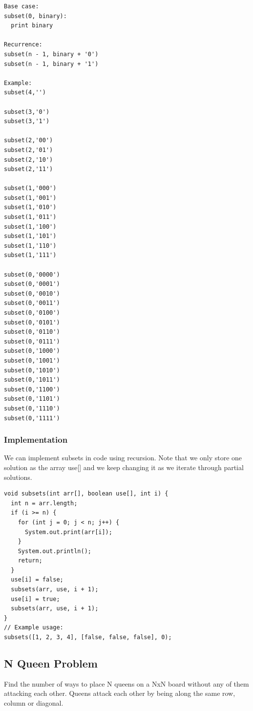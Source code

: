 \documentclass[11pt,oneside]{book}
\begin{document}
\begin{lstlisting}
Base case:
subset(0, binary):
  print binary
 
Recurrence:
subset(n - 1, binary + '0')
subset(n - 1, binary + '1')
 
Example:
subset(4,'')
 
subset(3,'0')
subset(3,'1')
 
subset(2,'00')
subset(2,'01')
subset(2,'10')
subset(2,'11')
 
subset(1,'000')
subset(1,'001')
subset(1,'010')
subset(1,'011')
subset(1,'100')
subset(1,'101')
subset(1,'110')
subset(1,'111')
 
subset(0,'0000')
subset(0,'0001')
subset(0,'0010')
subset(0,'0011')
subset(0,'0100')
subset(0,'0101')
subset(0,'0110')
subset(0,'0111')
subset(0,'1000')
subset(0,'1001')
subset(0,'1010')
subset(0,'1011')
subset(0,'1100')
subset(0,'1101')
subset(0,'1110')
subset(0,'1111')
\end{lstlisting}

\subsubsection{Implementation}

We can implement subsets in code using recursion. Note that we only store one solution as the array use[] and we keep changing it as we iterate through partial solutions.

\begin{lstlisting}
void subsets(int arr[], boolean use[], int i) {
  int n = arr.length;
  if (i >= n) {
    for (int j = 0; j < n; j++) {
      System.out.print(arr[i]);
    }
    System.out.println();
    return;
  }
  use[i] = false;
  subsets(arr, use, i + 1);
  use[i] = true;
  subsets(arr, use, i + 1);
}
// Example usage:
subsets([1, 2, 3, 4], [false, false, false], 0);
\end{lstlisting}

\subsection{N Queen Problem}

Find the number of ways to place N queens on a NxN board without any of them attacking each other. Queens attack each other by being along the same row, column or diagonal.
\end{document}
